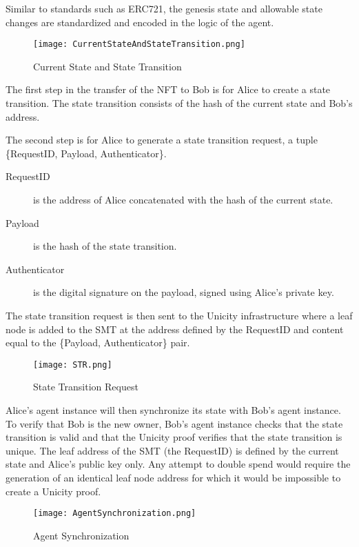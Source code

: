 \documentclass{article}
\begin{document}
Similar to standards such as ERC721, the genesis state and allowable state changes are standardized and encoded in the logic of the agent.

\begin{figure}[htbp]
    \centering
    \texttt{[image: CurrentStateAndStateTransition.png]}
    \caption{Current State and State Transition}
    \label{fig:CurrentState}
\end{figure}



The first step in the transfer of the NFT to Bob is for Alice to create a state transition. The state transition consists of the hash of the current state and Bob's address.


The second step is for Alice to generate a state transition request, a tuple \{RequestID, Payload, Authenticator\}.

\begin{description}
    \item[RequestID] is the address of Alice concatenated with the hash of the current state.
    \item[Payload] is the hash of the state transition.
    \item[Authenticator] is the digital signature on the payload, signed using Alice's private key.
\end{description}

The state transition request is then sent to the Unicity infrastructure where a leaf node is added to the SMT at the address defined by the RequestID and content equal to the \{Payload, Authenticator\} pair.

\begin{figure}[H]
    \centering
    \texttt{[image: STR.png]}
    \caption{State Transition Request}
    \label{fig:STR}
\end{figure}

Alice's agent instance will then synchronize its state with Bob's agent instance. To verify that Bob is the new owner, Bob's agent instance checks that the state transition is valid and that the Unicity proof verifies that the state transition is unique. The leaf address of the SMT (the RequestID) is defined by the current state and Alice's public key only.  Any attempt to double spend would require the generation of an identical leaf node address for which it would be impossible to create a Unicity proof.

\begin{figure}[H]
    \centering
    \texttt{[image: AgentSynchronization.png]}
    \caption{Agent Synchronization}
    \label{fig:AgentSynch}
\end{figure}
\end{document}
